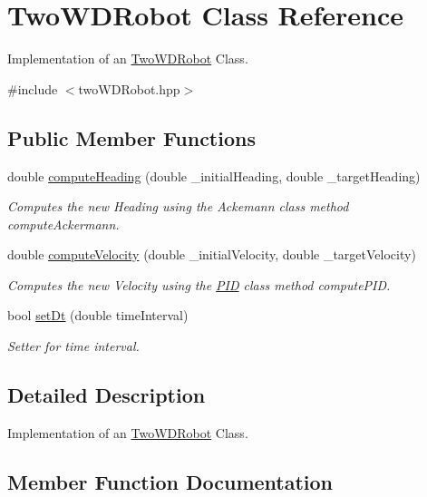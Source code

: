 \hypertarget{classTwoWDRobot}{}\section{Two\+W\+D\+Robot Class Reference}
\label{classTwoWDRobot}


Implementation of an \hyperlink{classTwoWDRobot}{Two\+W\+D\+Robot} Class.  




{\ttfamily \#include $<$two\+W\+D\+Robot.\+hpp$>$}

\subsection*{Public Member Functions}
\begin{DoxyCompactItemize}
\item 
double \hyperlink{classTwoWDRobot_aaa0e059e4c80b75ec2bf5daca6943552}{compute\+Heading} (double \+\_\+initial\+Heading, double \+\_\+target\+Heading)
\begin{DoxyCompactList}\small\item\em Computes the new Heading using the Ackemann class method compute\+Ackermann. \end{DoxyCompactList}\item 
double \hyperlink{classTwoWDRobot_a3a77115505f0be8b545d877fc0a34d1c}{compute\+Velocity} (double \+\_\+initial\+Velocity, double \+\_\+target\+Velocity)
\begin{DoxyCompactList}\small\item\em Computes the new Velocity using the \hyperlink{classPID}{P\+ID} class method compute\+P\+ID. \end{DoxyCompactList}\item 
bool \hyperlink{classTwoWDRobot_a0112dd192de96966588226c55d84223d}{set\+Dt} (double time\+Interval)
\begin{DoxyCompactList}\small\item\em Setter for time interval. \end{DoxyCompactList}\end{DoxyCompactItemize}


\subsection{Detailed Description}
Implementation of an \hyperlink{classTwoWDRobot}{Two\+W\+D\+Robot} Class. 

\subsection{Member Function Documentation}
\mbox{\label{classTwoWDRobot_aaa0e059e4c80b75ec2bf5daca6943552}} 
